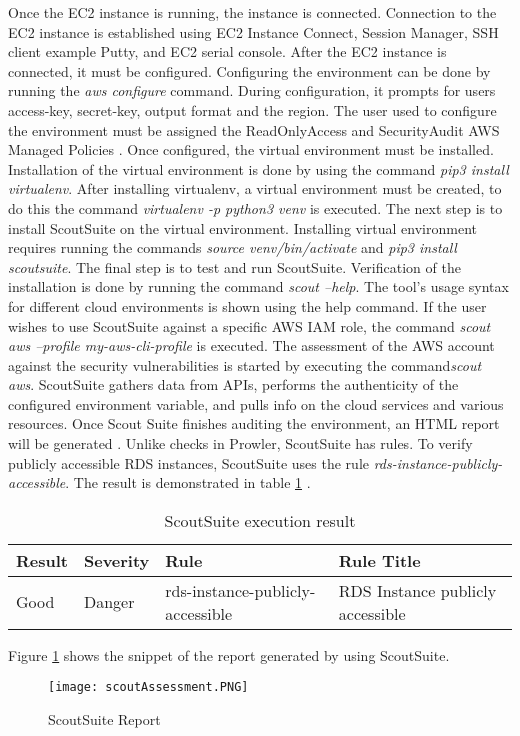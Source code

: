 \par Once the EC2 instance is running, the instance is connected.
Connection to the EC2 instance is established using EC2 Instance Connect, Session Manager, SSH client example Putty, and EC2 serial console.
After the EC2 instance is connected, it must be configured.
Configuring the environment can be done by running the
\textit{aws configure} command.
During configuration, it prompts for users access-key,
secret-key, output format and the region.
The user used to configure the environment must
be assigned the
ReadOnlyAccess and SecurityAudit AWS Managed Policies
\cite{87}.
Once configured, the virtual environment must be installed.
Installation of the virtual environment is done by using the command \textit{pip3 install virtualenv}.
After installing virtualenv, a virtual environment must be created, to do this the command \textit{virtualenv -p python3 venv} is executed.
The next step is to install ScoutSuite on the virtual environment.
Installing virtual environment requires running the commands \textit{source venv/bin/activate} and \textit{pip3 install scoutsuite}.
The final step is to test and run ScoutSuite.
Verification of the installation is done by running the command \textit{scout --help}.
The tool's usage syntax for different cloud environments is shown using the help command.
If the user wishes to use ScoutSuite against a specific
AWS IAM role, the command \textit{scout aws --profile my-aws-cli-profile} is executed.
The assessment of the AWS account against the security
vulnerabilities is started by executing the command\textit{scout aws}.
ScoutSuite gathers data from APIs, performs the authenticity of the configured environment variable, and pulls info on the cloud services and various resources.
Once Scout Suite finishes auditing the environment, an
HTML report will be generated \cite{87}.
Unlike checks in Prowler, ScoutSuite has rules.
To verify publicly accessible RDS instances, ScoutSuite uses the rule \textit{rds-instance-publicly-accessible}.
The result is demonstrated in table
\ref{tab:scoutsuiterule} \cite{88}.

\begin{table}[h!]
    \begin{center}
        \caption{ScoutSuite execution result}
        \label{tab:scoutsuiterule}
        \begin{tabular}{|p{1.4cm}|p{1.7cm}|p{5.0cm}|p{6.0cm}|}
            \hline
            \textbf{Result} & \textbf{Severity} & \textbf{Rule} & \textbf{Rule Title}\\
            \hline
            Good & Danger & rds-instance-publicly-accessible & RDS Instance publicly accessible \\
            \hline
        \end{tabular}
    \end{center}
\end{table}


Figure \ref{fig:deployscoutsuite} shows the snippet of
the report generated by using ScoutSuite.

\begin{figure}
    \centering
    \texttt{[image: scoutAssessment.PNG]}
    \caption{ScoutSuite Report}
    \label{fig:deployscoutsuite}
\end{figure}